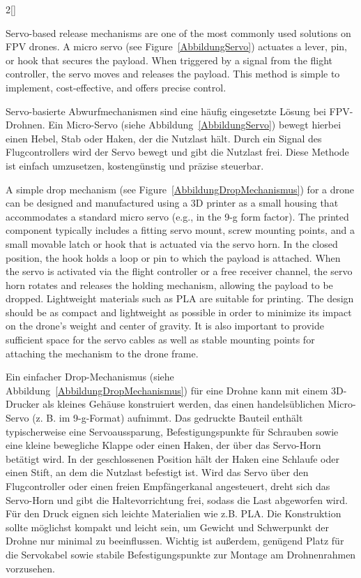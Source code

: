 \begin{paracol}{2}[]
\colende

\renewcommand{\deutschertitel}{Servo-basierte Abwurfmechanismen}
\renewcommand{\englischertitel}{Servo-based release mechanisms}
\makroabschnitt
\label{AbschnittDropServo}

Servo-based release mechanisms are one of the most commonly used solutions on FPV drones. A micro servo (see Figure~\ref{AbbildungServo}) actuates a lever, pin, or hook that secures the payload. When triggered by a signal from the flight controller, the servo moves and releases the payload. This method is simple to implement, cost-effective, and offers precise control.

\colger

Servo-basierte Abwurfmechanismen sind eine häufig eingesetzte Lösung bei FPV-Drohnen. Ein Micro-Servo (siehe Abbildung~\ref{AbbildungServo}) bewegt hierbei einen Hebel, Stab oder Haken, der die Nutzlast hält. Durch ein Signal des Flugcontrollers wird der Servo bewegt und gibt die Nutzlast frei. Diese Methode ist einfach umzusetzen, kostengünstig und präzise steuerbar.

\coleng

A simple drop mechanism (see Figure~\ref{AbbildungDropMechanismus}) for a drone can be designed and manufactured using a 3D printer as a small housing that accommodates a standard micro servo (e.g., in the 9-g form factor). The printed component typically includes a fitting servo mount, screw mounting points, and a small movable latch or hook that is actuated via the servo horn. In the closed position, the hook holds a loop or pin to which the payload is attached. When the servo is activated via the flight controller or a free receiver channel, the servo horn rotates and releases the holding mechanism, allowing the payload to be dropped. Lightweight materials such as PLA are suitable for printing. The design should be as compact and lightweight as possible in order to minimize its impact on the drone’s weight and center of gravity. It is also important to provide sufficient space for the servo cables as well as stable mounting points for attaching the mechanism to the drone frame.

\colger

Ein einfacher Drop-Mechanismus (siehe Abbildung~\ref{AbbildungDropMechanismus}) für eine Drohne kann mit einem 3D-Drucker als kleines Gehäuse konstruiert werden, das einen handelsüblichen Micro-Servo (z. B. im 9-g-Format) aufnimmt. Das gedruckte Bauteil enthält typischerweise eine Servoaussparung, Befestigungspunkte für Schrauben sowie eine kleine bewegliche Klappe oder einen Haken, der über das Servo-Horn betätigt wird. In der geschlossenen Position hält der Haken eine Schlaufe oder einen Stift, an dem die Nutzlast befestigt ist. Wird das Servo über den Flugcontroller oder einen freien Empfängerkanal angesteuert, dreht sich das Servo-Horn und gibt die Haltevorrichtung frei, sodass die Last abgeworfen wird. Für den Druck eignen sich leichte Materialien wie z.B. PLA. Die Konstruktion sollte möglichst kompakt und leicht sein, um Gewicht und Schwerpunkt der Drohne nur minimal zu beeinflussen. Wichtig ist außerdem, genügend Platz für die Servokabel sowie stabile Befestigungspunkte zur Montage am Drohnenrahmen vorzusehen.


\end{paracol}
